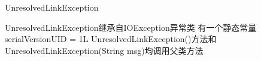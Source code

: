 \begin{XeClass}{UnresolvedLinkException}
   
 UnresolvedLinkException继承自IOException异常类
 有一个静态常量serialVersionUID = 1L
 UnresolvedLinkException()方法和UnresolvedLinkException(String msg)均调用父类方法

\end{XeClass}
